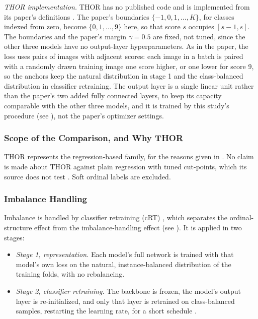 \documentclass{icsthesis}
\newcommand{\secref}[1]{\textit{\nameref{#1}}}
\begin{document}
\begin{mainmatter}
					\textit{THOR implementation.} THOR has no published code and is
					implemented from its paper's definitions \citep{fuchs2022}. The
					paper's boundaries $\{-1, 0, 1, \ldots, K\}$, for classes indexed
					from zero, become $\{0, 1, \ldots, 9\}$ here, so that score $s$
					occupies $[s-1, s]$. The boundaries and the paper's margin $\gamma =
					0.5$ are fixed, not tuned, since the other three models have no
					output-layer hyperparameters. As in the paper, the loss uses pairs
					of images with adjacent scores: each image in a batch is paired with
					a randomly drawn training image one score higher, or one lower for
					score 9, so the anchors keep the natural distribution in stage 1 and
					the class-balanced distribution in classifier retraining. The output
					layer is a single linear unit rather than the paper's two added
					fully connected layers, to keep its capacity comparable with the
					other three models, and it is trained by this study's procedure (see
					\secref{sec:training}), not the paper's optimizer settings.

				\subsubsection{Scope of the Comparison, and Why THOR}\label{sec:whythor}

					THOR represents the regression-based family, for the reasons given
					in \secref{sec:ordinal}. No claim is made about THOR against plain
					regression with tuned cut-points, which its source does not test
					\citep{fuchs2022}. Soft ordinal labels \citep{diaz2019} are
					excluded.



				\subsubsection{Imbalance Handling}\label{sec:imbalance}

					Imbalance is handled by classifier retraining (cRT) \citep{kang2020}, which
					separates the ordinal-structure effect from the imbalance-handling effect (see
					\secref{sec:ordinal}). It is applied in two stages:

					\begin{itemize}
						\item \textit{Stage 1, representation.} Each model's full network is trained
							with that model's own loss on the natural, instance-balanced
							distribution of the training folds, with no rebalancing.
						\item \textit{Stage 2, classifier retraining.} The backbone is frozen, the
							model's output layer is re-initialized, and only that layer is retrained
							on class-balanced samples, restarting the learning rate, for a short
							schedule \citep{kang2020}.
					\end{itemize}


\end{mainmatter}
\end{document}
